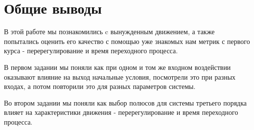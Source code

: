 \chapter{Общие выводы}
\label{ch:chap3}
В этой работе мы познакомились c вынужденным движением, а также попытались оценить его качество с помощью уже знакомых нам метрик с первого курса - перерегулирование и время переходного процесса.

В первом задании мы поняли как при одном и том же входном воздействии оказывают влияние на выход  начальные условия, посмотрели это при разных входах, а потом повторили это для разных параметров системы.

Во втором задании мы поняли как выбор полюсов для системы третьего порядка влияет на характеристики движения - перерегулирование и время переходного процесса.
\endinput